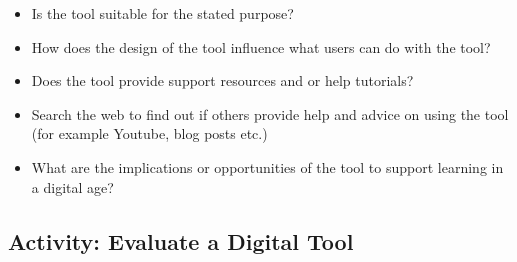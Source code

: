 \documentclass[
]{book}
\providecommand{\tightlist}{%
  \setlength{\itemsep}{0pt}\setlength{\parskip}{0pt}}
\theoremstyle{definition}
\theoremstyle{definition}
\theoremstyle{definition}
\theoremstyle{definition}
\theoremstyle{remark}
\begin{document}
\begin{reflect}
\begin{itemize}
\tightlist
\item
  Is the tool suitable for the stated purpose?\\
\item
  How does the design of the tool influence what users can do with the tool?\\
\item
  Does the tool provide support resources and or help tutorials?\\
\item
  Search the web to find out if others provide help and advice on using the tool (for example Youtube, blog posts etc.)\\
\item
  What are the implications or opportunities of the tool to support learning in a digital age?
\end{itemize}
\end{reflect}

\hypertarget{activity-evaluate-a-digital-tool}{%
\subsection*{Activity: Evaluate a Digital Tool}\label{activity-evaluate-a-digital-tool}}
\end{document}
